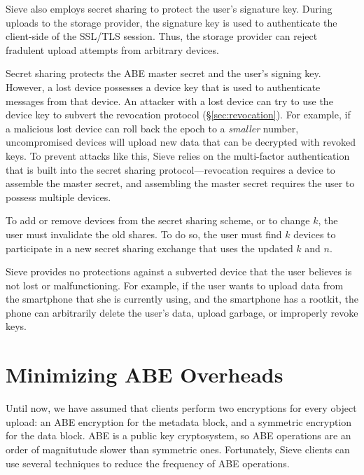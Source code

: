 Sieve also employs secret sharing to protect
the user's signature key. During uploads to
the storage provider, the signature key is
used to authenticate the client-side of the
SSL/TLS session. Thus, the storage provider
can reject fradulent upload attempts from
arbitrary devices.

Secret sharing protects the ABE master secret
and the user's signing key. However, a lost
device possesses a device key that is used to
authenticate messages from that device. An
attacker with a lost device can try to use
the device key to subvert the revocation
protocol (\S\ref{sec:revocation}). For example,
if a malicious lost device can roll back the
epoch to a \emph{smaller} number, uncompromised
devices will upload new data that can be
decrypted with revoked keys. To prevent attacks
like this, Sieve relies on the multi-factor
authentication that is built into the secret
sharing protocol---revocation requires a device
to assemble the master secret, and assembling
the master secret requires the user to possess
multiple devices.

To add or remove devices from the secret sharing 
scheme, or to change $k$, the user must invalidate
the old shares. To do so, the user must find $k$
devices to participate in a new secret sharing
exchange that uses the updated $k$ and $n$.

Sieve provides no protections against a subverted
device that the user believes is not lost or
malfunctioning. For example, if the user wants
to upload data from the smartphone that she
is currently using, and the smartphone has a
rootkit, the phone can arbitrarily delete the
user's data, upload garbage, or improperly
revoke keys.

\section{Minimizing ABE Overheads}
\label{sec:minAbeCost}

Until now, we have assumed that clients
perform two encryptions for every object
upload: an ABE encryption for the metadata
block, and a symmetric encryption for
the data block. ABE is a public key
cryptosystem, so ABE operations are an
order of magnitutude slower than symmetric
ones. Fortunately, Sieve clients can use
several techniques to reduce the frequency
of ABE operations.

